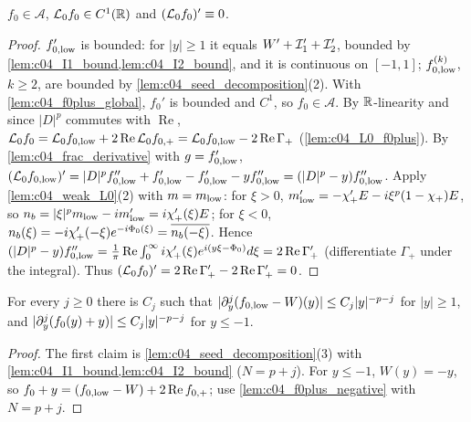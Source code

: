\begin{lemma}[$\mc L_0f_0$ is constant]
  \label{lem:c04_L0_f0_constant}
  $f_0\in\mathcal A$, $\mathcal{L}_0f_0\in C^1(\mathbb{R})$ and $(\mathcal{L}_0f_0)'\equiv0$.
\end{lemma}
\begin{proof}
  $f_{0,\textup{low}}'$ is bounded: for $|y|\ge1$ it equals $W'+\mathcal{I}_1'+\mathcal{I}_2'$, bounded by \cref{lem:c04_I1_bound,lem:c04_I2_bound}, and it
  is continuous on $[-1,1]$; $f_{0,\textup{low}}^{(k)}$, $k\ge2$, are bounded by \cref{lem:c04_seed_decomposition}(2). With
  \cref{lem:c04_f0plus_global}, $f_0'$ is bounded and $C^1$, so $f_0\in\mathcal A$. By $\mathbb{R}$-linearity and since $|D|^p$ commutes with
  $\operatorname{Re}$, $\mathcal{L}_0f_0=\mathcal{L}_0f_{0,\textup{low}}+2\operatorname{Re}\mathcal{L}_0f_{0,+}=\mathcal{L}_0f_{0,\textup{low}}-2\operatorname{Re}\Gamma_+$
  (\cref{lem:c04_L0_f0plus}). By \cref{lem:c04_frac_derivative} with $g=f_{0,\textup{low}}'$,
  $(\mathcal{L}_0f_{0,\textup{low}})'=|D|^pf_{0,\textup{low}}''+f_{0,\textup{low}}'-f_{0,\textup{low}}'-yf_{0,\textup{low}}''=(|D|^p-y)f_{0,\textup{low}}''$.
  Apply \cref{lem:c04_weak_L0}(2) with $m=m_{\textup{low}}$: for $\xi>0$,
  $m_{\textup{low}}'=-\chi_+'E-i\xi^p(1-\chi_+)E$, so $n_b=|\xi|^pm_{\textup{low}}-im_{\textup{low}}'=i\chi_+'(\xi)E$; for $\xi<0$,
  $n_b(\xi)=-i\chi_+'(-\xi)e^{-i\Phi_0(\xi)}=\overline{n_b(-\xi)}$. Hence
  $(|D|^p-y)f_{0,\textup{low}}''=\frac1\pi\operatorname{Re}\int_0^\infty i\chi_+'(\xi)e^{i(y\xi-\Phi_0)}d\xi=2\operatorname{Re}\Gamma_+'$
  (differentiate $\Gamma_+$ under the integral). Thus $(\mathcal{L}_0f_0)'=2\operatorname{Re}\Gamma_+'-2\operatorname{Re}\Gamma_+'=0$.
\end{proof}

\begin{lemma}
  \label{lem:c04_seed_tails}
  For every $j\ge0$ there is $C_j$ such that $|\partial_y^j(f_{0,\textup{low}}-W)(y)|\le C_j|y|^{-p-j}$ for $|y|\ge1$, and
  $|\partial^j_y(f_0(y)+y)|\le C_j|y|^{-p-j}$ for $y\le-1$.
\end{lemma}
\begin{proof}
  The first claim is \cref{lem:c04_seed_decomposition}(3) with \cref{lem:c04_I1_bound,lem:c04_I2_bound} ($N=p+j$). For $y\le-1$,
  $W(y)=-y$, so $f_0+y=(f_{0,\textup{low}}-W)+2\operatorname{Re}f_{0,+}$; use \cref{lem:c04_f0plus_negative} with $N=p+j$.
\end{proof}

